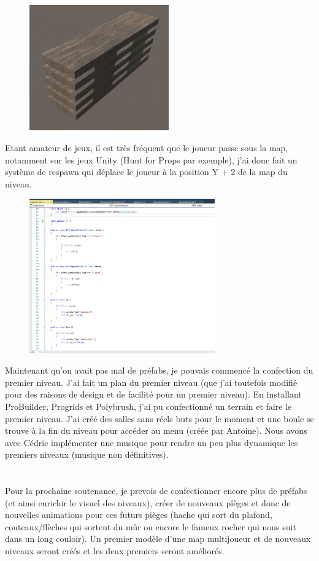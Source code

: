 \documentclass[titlepage, 13px, a4paper]{article}
\begin{document}
\begin{figure}
\includegraphics[width=6cm]{planche-game.png}
\end{figure}
Etant amateur de jeux, il est très fréquent que le joueur passe sous la map, notamment sur les jeux Unity 
(Hunt for Props par exemple), j'ai donc fait un système de respawn qui déplace le joueur à la position Y + 2
de la map du niveau.


\newpage

\begin{figure}
\includegraphics[width=8cm]{piquescript-game.png}
\end{figure}
Maintenant qu'on avait pas mal de préfabs, je pouvais commencé la confection du premier niveau. J'ai fait un plan du 
premier niveau (que j'ai toutefois modifié pour des raisons de design et de facilité pour un premier niveau).
En installant ProBuilder, Progrids et Polybrush, j'ai pu confectionné un terrain et faire le premier niveau. J'ai
créé des salles sans réels buts pour le moment et une boule se trouve à la fin du niveau pour accéder au menu (créée
par Antoine). Nous avons avec Cédric implémenter une musique pour rendre un peu plus dynamique les premiers niveaux 
(musique non définitives).

\paragraph{} \hspace{0pt} \\
  Pour la prochaine soutenance, je prevois de confectionner encore plus de préfabs (et ainsi enrichir le visuel 
des niveaux), créer de nouveaux pîèges et donc de nouvelles animations pour ces futurs pièges (hache qui sort du plafond, 
couteaux/flèches qui sortent du mûr ou encore le fameux rocher qui nous suit dans un long couloir). Un premier modèle d'une
map multijoueur et de nouveaux niveaux seront créés et les deux premiers seront améliorés.
\end{document}
